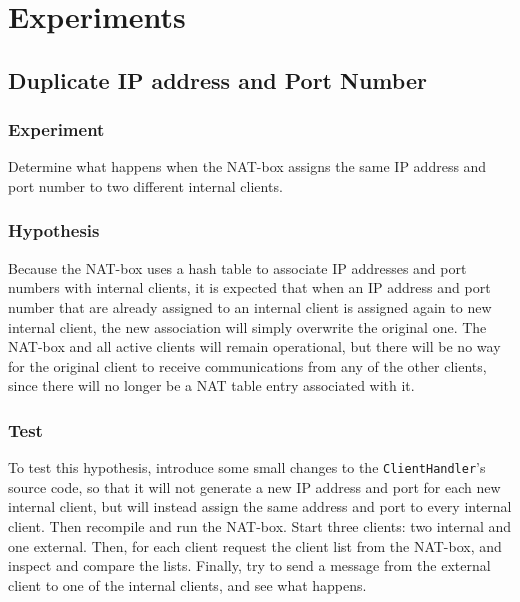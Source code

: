 \documentclass[10pt, a4paper]{article}
\begin{document}

\section{Experiments}
\label{ssec:exp}


\subsection{Duplicate IP address and Port Number}
\label{ssec:dup}


\subsubsection{Experiment}
\label{sssec:dupexp}

Determine what happens when the NAT-box assigns the same IP address and port
number to two different internal clients.


\subsubsection{Hypothesis}
\label{sssec:duphyp}

Because the NAT-box uses a hash table to associate IP addresses and port numbers
with internal clients, it is expected that when an IP address and port number
that are already assigned to an internal client is assigned again to new
internal client, the new association will simply overwrite the original one. The
NAT-box and all active clients will remain operational, but there will be no way
for the original client to receive communications from any of the other clients,
since there will no longer be a NAT table entry associated with it.


\subsubsection{Test}
\label{sssec:duptest}

To test this hypothesis, introduce some small changes to the
\texttt{ClientHandler}'s source code, so that it will not generate a new IP
address and port for each new internal client, but will instead assign the same
address and port to every internal client. Then recompile and run the NAT-box.
Start three clients: two internal and one external. Then, for each client
request the client list from the NAT-box, and inspect and compare the lists.
Finally, try to send a message from the external client to one of the internal
clients, and see what happens.
\end{document}
